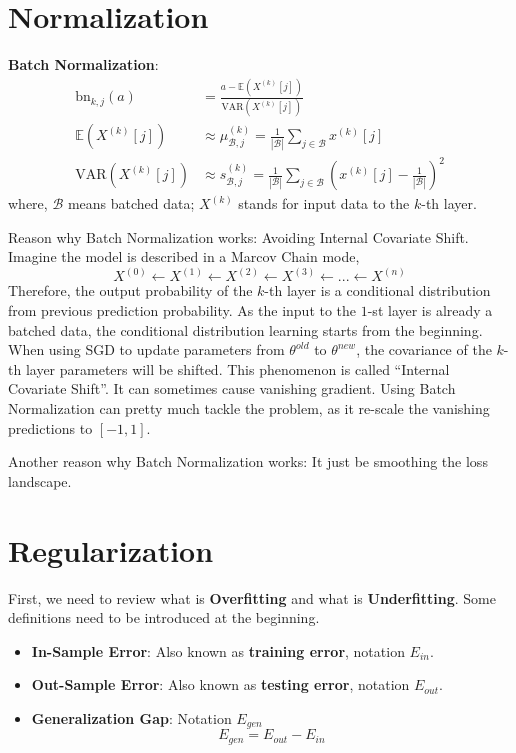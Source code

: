 \documentclass[a4paper]{article}
\begin{document}
\section{Normalization}  

\textbf{Batch Normalization}: 
\begin{align}
	\text{bn}_{k, j} (a) &= \frac{a - \mathbb{E} (X^{(k)}[j])}{\text{VAR} (X^{(k)}[j])} \\
	\mathbb{E} (X^{(k)}[j]) &\approx \mu_{\mathcal{B}, j}^{(k)} = \frac{1}{|\mathcal{B}|} \sum_{j \in \mathcal{B}} x^{(k)}[j] \\
	\text{VAR} (X^{(k)}[j]) &\approx s_{\mathcal{B}, j}^{(k)} = \frac{1}{|\mathcal{B}|} \sum_{j \in \mathcal{B}} (x^{(k)}[j] - \frac{1}{|\mathcal{B}|})^2
\end{align}
where, $\mathcal{B}$ means batched data; $X^{(k)}$ stands for input data to the $k$-th layer.

Reason why Batch Normalization works: Avoiding Internal Covariate Shift. Imagine the model is described in a Marcov Chain mode,
\begin{equation}
	X^{(0)} \leftarrow X^{(1)} \leftarrow X^{(2)} \leftarrow X^{(3)} \leftarrow ... \leftarrow X^{(n)}
\end{equation}
Therefore, the output probability of the $k$-th layer is a conditional distribution from previous prediction probability. As the input to the $1$-st layer is already a batched data, the conditional distribution learning starts from the beginning. When using SGD to update parameters from $\theta^{old}$ to $\theta^{new}$, the covariance of the $k$-th layer parameters will be shifted. This phenomenon is called ``Internal Covariate Shift''. It can sometimes cause vanishing gradient. Using Batch Normalization can pretty much tackle the problem, as it re-scale the vanishing predictions to $[-1, 1]$.

Another reason why Batch Normalization works: It just be smoothing the loss landscape.
 
\section{Regularization}

First, we need to review what is \textbf{Overfitting} and what is \textbf{Underfitting}. Some definitions need to be introduced at the beginning.
\begin{itemize}
	\item \textbf{In-Sample Error}: Also known as \textbf{training error}, notation $E_{in}$.
	\item \textbf{Out-Sample Error}: Also known as \textbf{testing error}, notation $E_{out}$.
	\item \textbf{Generalization Gap}: Notation $E_{gen}$
	\begin{equation}
		E_{gen} = E_{out} - E_{in}
	\end{equation}
\end{itemize}
\end{document}
